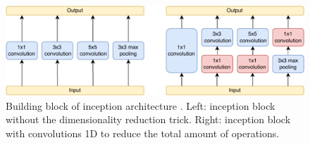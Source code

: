  \begin{figure}[hbt]
 
  \includegraphics[width=1.0\linewidth]{./distillation/images/inception.pdf}
  \caption{Building block of inception architecture \autocite{szegedy2015}. Left: inception block without the dimensionality reduction trick. Right: inception block with convolutions 1D to reduce the total amount of operations.}
  \label{fig:inception}
\end{figure}



